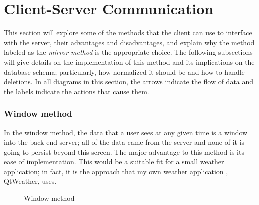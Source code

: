 
\section{Client-Server Communication} \label{sec:communication}






This section will explore some of the methods that the client can use to
interface with the server, their advantages and disadvantages, and explain why
the method labeled as the \textit{mirror method} is the appropriate choice. The
following subsections will give details on the implementation of this method and
its implications on the database schema; particularly, how normalized it should
be and how to handle deletions. In all diagrams in this section, the arrows
indicate the flow of data and the labels indicate the actions that cause them.


\subsubsection{Window method}

In the window method, the data that a user sees at any given time is a window
into the back end server; all of the data came from the server and none of it is
going to persist beyond this screen. The major advantage to this method is its
ease of implementation. This would be a suitable fit for a small weather
application; in fact, it is the approach that my own weather application ,
QtWeather, uses.  


\begin{figure}[h!]
\centering
{}
\caption{Window method}
\label{fig:window}
\end{figure}


